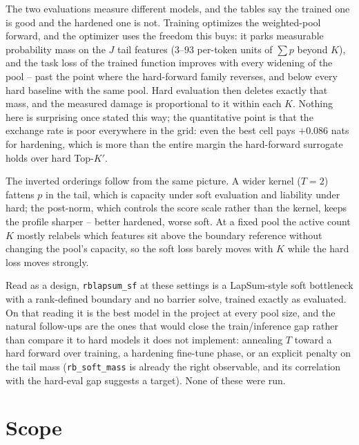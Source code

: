 \documentclass[11pt,a4paper]{article}
\newcommand{\code}[1]{\texttt{#1}}
\newcommand{\Kp}{K'}
\begin{document}
The two evaluations measure different models, and the tables say the trained
one is good and the hardened one is not. Training optimizes the weighted-pool
forward, and the optimizer uses the freedom this buys: it parks measurable
probability mass on the $J$ tail features ($3$--$93$ per-token units of
$\sum p$ beyond $K$), and the task loss of the trained function improves with
every widening of the pool -- past the point where the hard-forward family
reverses, and below every hard baseline with the same pool. Hard evaluation
then deletes exactly that mass, and the measured damage is proportional to it
within each $K$. Nothing here is surprising once stated this way; the
quantitative point is that the exchange rate is poor everywhere in the grid:
even the best cell pays $+0.086$ nats for hardening, which is more than the
entire margin the hard-forward surrogate holds over hard Top-$\Kp$.

The inverted orderings follow from the same picture. A wider kernel ($T=2$)
fattens $p$ in the tail, which is capacity under soft evaluation and liability
under hard; the post-norm, which controls the score scale rather than the
kernel, keeps the profile sharper -- better hardened, worse soft. At a fixed
pool the active count $K$ mostly relabels which features sit above the
boundary reference without changing the pool's capacity, so the soft loss
barely moves with $K$ while the hard loss moves strongly.

Read as a design, \code{rblapsum\_sf} at these settings is a LapSum-style
soft bottleneck with a rank-defined boundary and no barrier solve, trained
exactly as evaluated. On that reading it is the best model in the project at
every pool size, and the natural follow-ups are the ones that would close the
train/inference gap rather than compare it to hard models it does not
implement: annealing $T$ toward a hard forward over training, a hardening
fine-tune phase, or an explicit penalty on the tail mass
(\code{rb\_soft\_mass} is already the right observable, and its correlation
with the hard-eval gap suggests a target). None of these were run.

\section{Scope}
\end{document}
